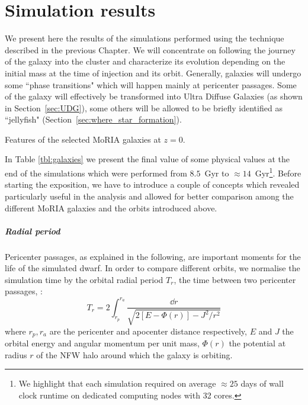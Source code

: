 
\chapter{Simulation results}
\label{ch:sim_results}

We present here the results of the simulations performed using the technique described in the previous Chapter.
We will concentrate on following the journey of the galaxy into the cluster and characterize its evolution depending on the initial mass at the time of injection and its orbit.
Generally, galaxies will undergo some ``phase transitions" which will happen mainly at pericenter passages.
Some of the galaxy will effectively be transformed into Ultra Diffuse Galaxies (as shown in Section~\ref{sec:UDG}), some others will be allowed to be briefly identified as ``jellyfish" (Section~\ref{sec:where_star_formation}).

\begin{sidewaystable}
 \centering
 \footnotesize
 
 \caption{Features of the selected MoRIA galaxies at $z=0$.} \label{tbl:galaxies}
\end{sidewaystable}

In Table \ref{tbl:galaxies} we present the final value of some physical values at the end of the simulations which were performed from $8.5$~Gyr to $\approx 14$~Gyr\footnote{We highlight that each simulation required on average $\approx 25$ days of wall clock runtime on dedicated computing nodes with 32 cores.
}.
Before starting the exposition, we have to introduce a couple of concepts which revealed particularly useful in the analysis and allowed for better comparison among the different MoRIA galaxies and the orbits introduced above.

\paragraph*{Radial period}
Pericenter passages, as explained in the following, are important moments for the life of the simulated dwarf.
In order to compare different orbits, we normalise the simulation time by the orbital radial period $T_r$, \ie{} the time between two pericenter passages, \citep[p.~146]{BinneyTremaine2008}:
\begin{equation}
    T_r = 2 \int^{r_a}_{r_p} \frac{\dd r}{\sqrt{2\left[E-\Phi(r) \right] - J^2/r^2}}
    \label{eq:radial_period}
\end{equation}
where $r_p, r_a$ are the pericenter and apocenter distance respectively, $E$ and $J$ the orbital energy and angular momentum per unit mass, $\Phi(r)$ the potential at radius $r$ of the NFW halo around which the galaxy is orbiting.

